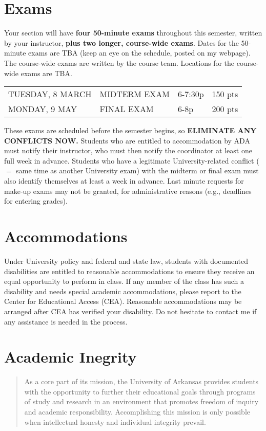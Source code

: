 \documentclass[margin,line,pifont,palatino,courier]{res}
\begin{document}
\begin{resume}
\section{\sc Exams} Your section will have {\bf four 50-minute exams} throughout this semester, written by your instructor, {\bf plus two longer, course-wide exams}.  Dates for the 50-minute exams are TBA (keep an eye on the schedule, posted on my webpage).  The course-wide exams are written by the course team.  Locations for the course-wide exams are TBA.  

\vspace{-0.05in}
{\bf
\begin{tabular}{llll}
TUESDAY, 8 MARCH & MIDTERM EXAM & 6-7:30p & 150 pts \\
MONDAY, 9 MAY & FINAL EXAM & 6-8p & 200 pts \\
\end{tabular} 
}

\vspace{-.1in}
These exams are scheduled before the semester begins, so {\bf ELIMINATE ANY CONFLICTS NOW.} Students who are entitled to accommodation by ADA must notify their instructor, who must then notify the coordinator at least one full week in advance. Students who have a legitimate University-related conflict ($=$ same time as another University exam) with the midterm or final exam must also identify themselves at least a week in advance. Last minute requests for make-up exams may not be granted, for administrative reasons (e.g., deadlines for entering grades). 

\section{\sc Accommodations} Under University policy and federal and state law, students with documented disabilities are entitled to reasonable accommodations to ensure they receive an equal opportunity to perform in class.  If any member of the class has such a disability and needs special academic accommodations, please report to the Center for Educational Access (CEA).  Reasonable accommodations may be arranged after CEA has verified your disability.  Do not hesitate to contact me if any assistance is needed in the process.
 
\section{\sc Academic Inegrity} 
\begin{quote}
As a core part of its mission, the University of Arkansas provides students with the opportunity to further their educational goals through programs of study and research in an environment that promotes freedom of inquiry and academic responsibility. Accomplishing this mission is only possible when intellectual honesty and individual integrity prevail.
\end{quote}


\end{resume}
\end{document}
